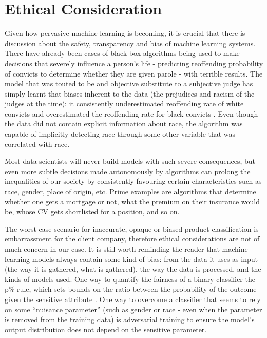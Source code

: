 \section{Ethical Consideration}

Given how pervasive  machine learning is becoming, it is crucial that there is discussion about the safety, transparency and bias of machine learning systems.
There have already been cases of black box algorithms being used to make decisions that severely influence a person's life -  predicting reoffending probability  of convicts to determine  whether they are given parole - with terrible results.
The model that was touted to be and objective substitute to a subjective judge has simply learnt that biases inherent to the data (the prejudices and racism of  the judges at the time):  it consistently underestimated reoffending rate of white convicts and overestimated the reoffending rate for black convicts \cite{propub}.
Even though the data did not contain explicit information about race, the algorithm  was capable of implicitly detecting race through some other variable that was correlated with race.

Most data scientists will never build models with such severe consequences, but even more subtle decisions  made autonomously by algorithms  can prolong the  inequalities of our society by consistently favouring certain  characteristics such as race, gender, place of origin, etc.
Prime examples are algorithms that determine whether one gets a mortgage or not, what the premium on their insurance would be, whose CV gets shortlisted for a position, and so on.

The worst case scenario for inaccurate,  opaque or biased product classification  is embarrassment for the client company,  therefore ethical considerations are not of much concern in our case.
It is still worth reminding the reader that machine learning  models always contain some kind of bias:  from the data it uses as input (the way it is gathered, what is gathered),  the way the data is processed, and the kinds of models used.
One way to quantify the fairness of a binary classifier the p\%  rule, which sets bounds on the ratio between the probability of the outcome given the sensitive attribute \cite{quantfair}.
One way to overcome a classifier that seems to rely on some ``nuisance parameter'' (such as gender or race - even when the parameter is removed from the training data) is adversarial training \cite{quantfair} to ensure the model's output distribution does not depend on the sensitive parameter.

